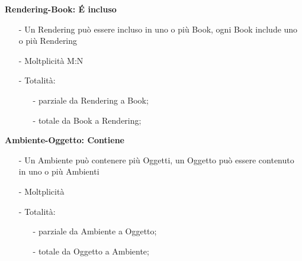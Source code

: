 \documentclass[a4paper,12pt]{report}
\begin{document}
{\bf Rendering-Book: \'E incluso}
\begin{itemize}
	\item[-] Un Rendering può essere incluso in uno o più Book, ogni Book include uno o più Rendering
	\item[-] Moltplicità M:N
	\item[-] Totalità:
	\begin{small}\begin{itemize}
		\item[-] parziale da Rendering a Book;
		\item[-] totale da Book a Rendering;
	\end{itemize}\end{small}
\end{itemize}
{\bf Ambiente-Oggetto: Contiene}
\begin{itemize}
	\item[-] Un Ambiente può contenere più Oggetti, un Oggetto può essere contenuto in uno o più Ambienti
	\item[-] Moltplicità 
	\item[-] Totalità:
	\begin{small}\begin{itemize}
		\item[-] parziale da Ambiente a Oggetto;
		\item[-] totale da Oggetto a Ambiente;
	\end{itemize}\end{small}
\end{itemize}
\end{document}

